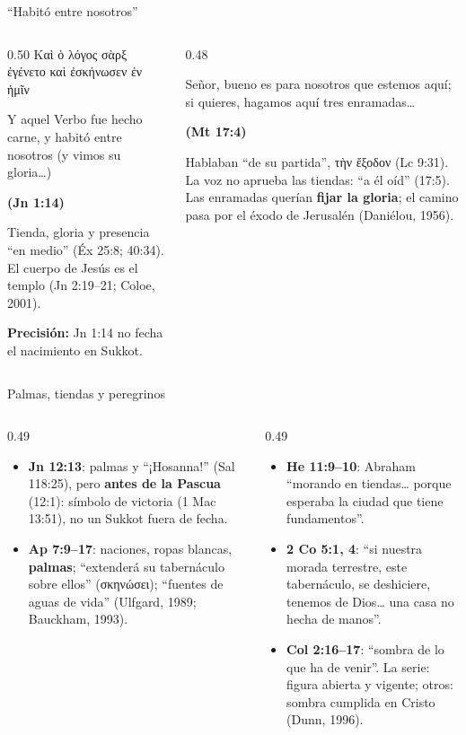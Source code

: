 \documentclass[hyperref={bookmarks=false},aspectratio=169]{beamer}
\newcommand{\grc}[1]{\foreignlanguage{ancientgreek}{#1}}
\newcommand{\fuente}[1]{\par\hfill{\upshape\bfseries\footnotesize\textcolor{tierraroja}{#1}}}
\newcommand{\destacar}[1]{\textbf{\textcolor{tierraroja}{#1}}}
\newcommand{\precision}[1]{{\footnotesize\color{sepia}\textbf{Precisión:} #1}}
\begin{document}
\begin{frame}{``Habitó entre nosotros''}
\begin{columns}[t,onlytextwidth]
\begin{column}{0.50\textwidth}
\centering\grc{Καὶ ὁ λόγος σὰρξ ἐγένετο καὶ ἐσκήνωσεν ἐν ἡμῖν}
\begin{cita}Y aquel Verbo fue hecho carne, y habitó entre nosotros (y vimos su gloria\ldots)\fuente{(Jn 1:14)}\end{cita}
\scriptsize Tienda, gloria y presencia ``en medio'' (Éx 25:8; 40:34). El cuerpo de Jesús es el templo (Jn 2:19--21; Coloe, 2001).\par\smallskip
\precision{Jn 1:14 no fecha el nacimiento en Sukkot.}
\end{column}
\begin{column}{0.48\textwidth}
\begin{cita}Señor, bueno es para nosotros que estemos aquí; si quieres, hagamos aquí tres enramadas\ldots\fuente{(Mt 17:4)}\end{cita}
\scriptsize Hablaban ``de su partida'', \grc{τὴν ἔξοδον} (Lc 9:31). La voz no aprueba las tiendas: ``a él oíd'' (17:5). Las enramadas querían \destacar{fijar la gloria}; el camino pasa por el éxodo de Jerusalén (Daniélou, 1956).
\end{column}
\end{columns}
\end{frame}

\begin{frame}{Palmas, tiendas y peregrinos}
\begin{columns}[t,onlytextwidth]
\begin{column}{0.49\textwidth}\scriptsize
\begin{itemize}
\item \textbf{Jn 12:13}: palmas y ``¡Hosanna!'' (Sal 118:25), pero \destacar{antes de la Pascua} (12:1): símbolo de victoria (1 Mac 13:51), no un Sukkot fuera de fecha.
\item \textbf{Ap 7:9--17}: naciones, ropas blancas, \destacar{palmas}; ``extenderá su tabernáculo sobre ellos'' (\grc{σκηνώσει}); ``fuentes de aguas de vida'' (Ulfgard, 1989; Bauckham, 1993).
\end{itemize}
\end{column}
\begin{column}{0.49\textwidth}\scriptsize
\begin{itemize}
\item \textbf{He 11:9--10}: Abraham ``morando en tiendas\ldots{} porque esperaba la ciudad que tiene fundamentos''.
\item \textbf{2 Co 5:1, 4}: ``si nuestra morada terrestre, este tabernáculo, se deshiciere, tenemos de Dios\ldots{} una casa no hecha de manos''.
\item \textbf{Col 2:16--17}: ``sombra de lo que ha de venir''. La serie: figura abierta y vigente; otros: sombra cumplida en Cristo (Dunn, 1996).
\end{itemize}
\end{column}
\end{columns}
\end{frame}
\end{document}
